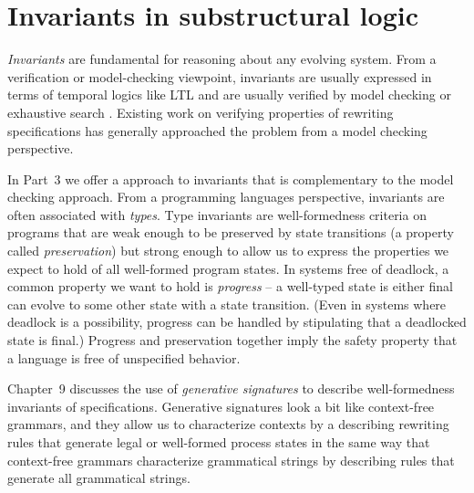 \section{Invariants in substructural logic}

{\it Invariants} are fundamental for reasoning about any evolving
system. From a verification or model-checking viewpoint, invariants
are usually expressed in terms of temporal logics like LTL and are
usually verified by model checking or exhaustive search
\cite[Chapter 10]{clavel11ltl}. Existing work
on verifying properties of rewriting specifications has generally
approached the problem from a model checking perspective. 

In Part~3 we offer a approach to invariants that is complementary to
the model checking approach.  From a programming languages
perspective, invariants are often associated with {\it types}. Type
invariants are well-formedness criteria on programs that are weak
enough to be preserved by state transitions (a property called {\it
  preservation}) but strong enough to allow us to express the properties
we expect to hold of all well-formed program states. In systems free
of deadlock, a common property we want to hold is {\it progress} -- a
well-typed state is either final can evolve to some other state with a
state transition. (Even in systems where deadlock is a possibility,
progress can be handled by stipulating that a deadlocked state is
final.) Progress and preservation together imply the safety property
that a language is free of unspecified behavior. 

Chapter~9 discusses the use of {\it generative signatures} to
describe well-formedness invariants of specifications. Generative
signatures look a bit like context-free grammars, and they allow us to
characterize contexts by a describing rewriting rules that generate
legal or well-formed
process states in the same way that context-free grammars characterize
grammatical strings by describing rules that generate all grammatical
strings.

